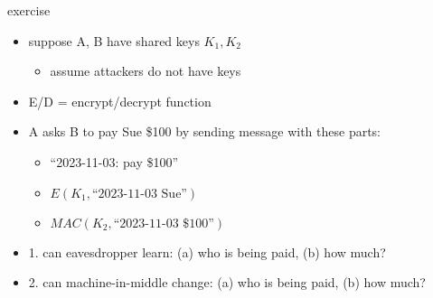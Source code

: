 \begin{frame}{exercise}
    \begin{itemize}
    \item suppose A, B have shared keys $K_1,K_2$
        \begin{itemize}
        \item assume attackers do not have keys
        \end{itemize}
    \item E/D = encrypt/decrypt function
    \item A asks B to pay Sue \$100 by sending message with these parts:
        \begin{itemize}
        \item ``2023-11-03: pay \$100''
        \item $E(K_1, \text{``2023-11-03 Sue''})$
        \item $MAC(K_2, \text{``2023-11-03 \$100''})$
        \end{itemize}
    \item 1. can eavesdropper learn: (a) who is being paid, (b) how much?
    \item 2. can machine-in-middle change: (a) who is being paid, (b) how much?
    \end{itemize}
\end{frame}
